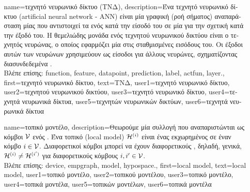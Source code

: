 {name={\foreignlanguage{greek}{τεχνητό νευρωνικό δίκτυο (ΤΝΔ)}},
	description={\foreignlanguage{greek}{Ένα τεχνητό νευρωνικό δίκτυο}\linebreak 
		(artificial neural network - ANN) \foreignlanguage{greek}{είναι μία γραφική (ροή σήματος) αναπαράσταση
		μίας}  \foreignlanguage{greek}{που αντιστοιχεί τα}  \foreignlanguage{greek}{ενός}
		 \foreignlanguage{greek}{κατά την είσοδό του σε μία}  
		\foreignlanguage{greek}{για την σχετική}  \foreignlanguage{greek}{κατά την έξοδό του. Η θεμελιώδης 
		μονάδα ενός τεχνητού νευρωνικού δικτύου είναι ο τεχνητός νευρώνας, ο οποίος εφαρμόζει μία}  
		 \foreignlanguage{greek}{στις σταθμισμένες εισόδους του.  
		Οι έξοδοι αυτών των νευρώνων χρησιμεύουν ως είσοδοι για άλλους νευρώνες, 
		σχηματίζοντας διασυνδεδεμένα} .\\
		\foreignlanguage{greek}{Βλέπε επίσης:} \gls{function}, \gls{feature}, \gls{datapoint}, \gls{prediction}, \gls{label}, \gls{actfun}, \gls{layer}.},
	first={\foreignlanguage{greek}{τεχνητό νευρωνικό δίκτυο}},
	text={\foreignlanguage{greek}{ΤΝΔ}},
	user1={\foreignlanguage{greek}{τεχνητό νευρωνικό δίκτυο}}, %
	user2={\foreignlanguage{greek}{τεχνητού νευρωνικού δικτύου}}, %
	user3={\foreignlanguage{greek}{τεχνητό νευρωνικό δίκτυο}}, %
	user4={\foreignlanguage{greek}{τεχνητά νευρωνικά δίκτυα}}, %
	user5={\foreignlanguage{greek}{τεχνητών νευρωνικών δικτύων}}, %
	user6={\foreignlanguage{greek}{τεχνητά νευρωνικά δίκτυα}} %
}

{name={\foreignlanguage{greek}{τοπικό μοντέλο}},
	description={\foreignlanguage{greek}{Θεωρούμε μία συλλογή}  
		\foreignlanguage{greek}{που αναπαριστώνται ως κόμβοι $\mathcal{V}$ ενός} . \foreignlanguage{greek}{Ένα τοπικό} 
		 (local model) $\mathcal{H}^{(i)}$ 
		\foreignlanguage{greek}{είναι ένας}  \foreignlanguage{greek}{εκχωρημένος σε έναν κόμβο $i \in \mathcal{V}$. 
		Διαφορετικοί κόμβοι μπορεί να έχουν διαφορετικούς} , \foreignlanguage{greek}{δηλαδή, γενικά, 
		$\mathcal{H}^{(i)} \neq \mathcal{H}^{(i')}$ για διαφορετικούς κόμβους} $i, i' \in \mathcal{V}$.\\
		\foreignlanguage{greek}{Βλέπε επίσης:} \gls{device}, \gls{empgraph}, \gls{model}, \gls{hypospace}.},
		first={local model},
		text={local model},
		user1={\foreignlanguage{greek}{τοπικό μοντέλο}}, %
		user2={\foreignlanguage{greek}{τοπικού μοντέλου}}, %
		user3={\foreignlanguage{greek}{τοπικό μοντέλο}}, %
		user4={\foreignlanguage{greek}{τοπικά μοντέλα}}, %
		user5={\foreignlanguage{greek}{τοπικών μοντέλων}}, %
		user6={\foreignlanguage{greek}{τοπικά μοντέλα}} %
}

